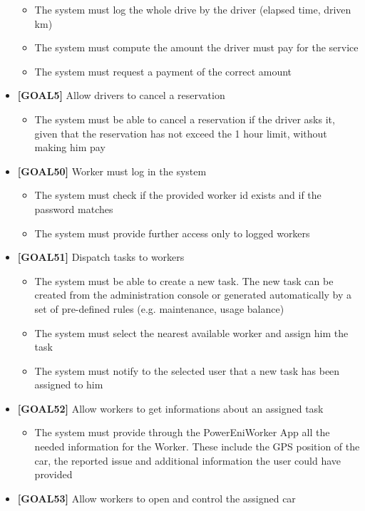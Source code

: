 \begin{itemize}
	\begin{itemize}
	\item The system must log the whole drive by the driver (elapsed time, driven km)
	\item The system must compute the amount the driver must pay for the service
	\item The system must request a payment of the correct amount 
	\end{itemize}
\item \textbf{[GOAL5]} Allow drivers to cancel a reservation
	\begin{itemize}
	\item The system must be able to cancel a reservation if the driver asks it, given that the reservation has not exceed the 1 hour limit, without making him pay
	\end{itemize}
\item \textbf{[GOAL50]} Worker must log in the system
	\begin{itemize}
	\item The system must check if the provided worker id exists and if the password matches
	\item The system must provide further access only to logged workers
	\end{itemize}
\item \textbf{[GOAL51]} Dispatch tasks to workers
	\begin{itemize}
	\item The system must be able to create a new task. The new task can be created from the administration console or generated automatically by a set of pre-defined rules (e.g. maintenance, usage balance)
	\item The system must select the nearest available worker and assign him the task
	\item The system must notify to the selected user that a new task has been assigned to him
	\end{itemize}
\item \textbf{[GOAL52]} Allow workers to get informations about an assigned task
	\begin{itemize}
	\item The system must provide through the PowerEniWorker App all the needed information for the Worker. These include the GPS position of the car, the reported issue and additional information the user could have provided
	\end{itemize}
\item \textbf{[GOAL53]} Allow workers to open and control the assigned car

\end{itemize}
